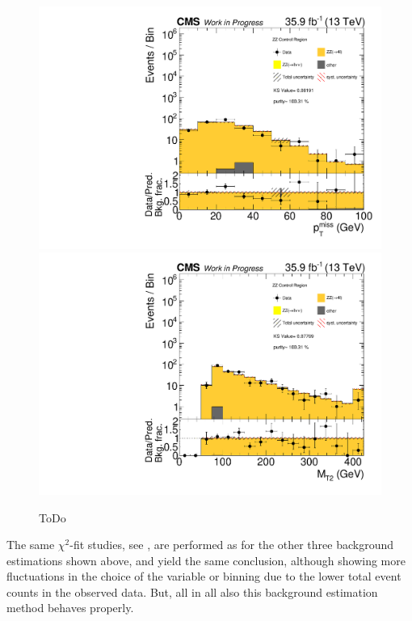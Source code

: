 \begin{figure}[tbp]
 \centering
 \includegraphics[width=\pairwidth]{figures/plots_CR_zz/CRZZ_LL_nom_met_log}
 \includegraphics[width=\pairwidth]{figures/plots_CR_zz/CRZZ_LL_nom_mt2_log}
 \caption{ToDo}
 \label{fig:CRZZ}
\end{figure}
The same $\chi^2$-fit studies, see , are performed as for the other three background estimations shown above, and yield the same conclusion, although showing more fluctuations in the choice of the variable or binning due to the lower total event counts in the observed data. But, all in all also this background estimation method behaves properly.
